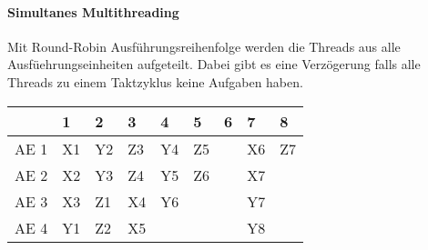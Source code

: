 \paragraph{Simultanes Multithreading} Mit Round-Robin Ausführungsreihenfolge werden die Threads
aus alle Ausfüehrungseinheiten aufgeteilt. Dabei gibt es eine Verzögerung falls alle Threads
zu einem Taktzyklus keine Aufgaben haben.\par
\begingroup\setlength\tabcolsep{2pt}
\begin{tabular}{|c|llllllll|}\hline
     & 1 & 2 & 3 & 4 & 5 & 6 & 7 & 8 \\\hline
AE 1 & X1 & Y2 & Z3 & Y4 & Z5 &   & X6 & Z7 \\
AE 2 & X2 & Y3 & Z4 & Y5 & Z6 &   & X7 &    \\
AE 3 & X3 & Z1 & X4 & Y6 &    &   & Y7 &    \\
AE 4 & Y1 & Z2 & X5 &    &    &   & Y8 &    \\\hline
\end{tabular}
\endgroup
